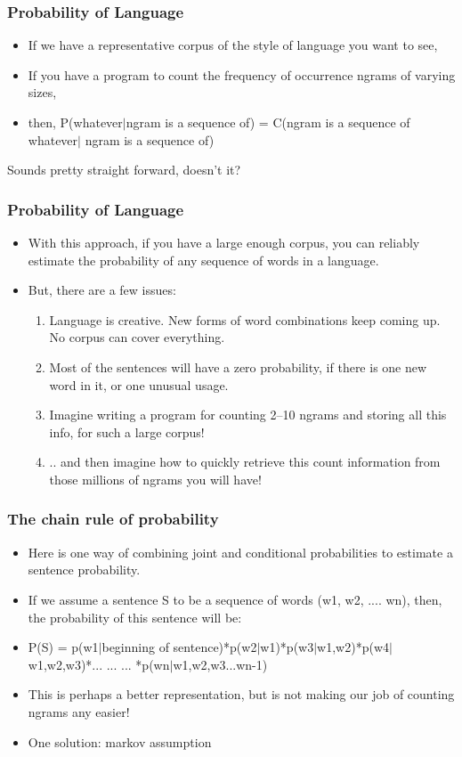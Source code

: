 \documentclass{beamer}
\begin{document}
\begin{frame}
\frametitle{Probability of Language}
\begin{itemize}
\item If we have a representative corpus of the style of language you want to see, 
\item If you have a program to count the frequency of occurrence ngrams of varying sizes,
\item then, P(whatever$|$ngram is a sequence of)  = C(ngram is a sequence of whatever$|$ ngram is a sequence of)
\end{itemize}
Sounds pretty straight forward, doesn't it?
\end{frame}

\begin{frame}
\frametitle{Probability of Language}
\begin{itemize}
\item With this approach, if you have a large enough corpus, you can reliably estimate the probability of any sequence of words in a language.
\item But, there are a few issues:
\begin{enumerate}
\item Language is creative. New forms of word combinations keep coming up. No corpus can cover everything. \pause
\item Most of the sentences will have a zero probability, if there is one new word in it, or one unusual usage. \pause
\item Imagine writing a program for counting 2--10 ngrams and storing all this info, for such a large corpus! \pause
\item .. and then imagine how to quickly retrieve this count information from those millions of ngrams you will have!
\end{enumerate}
\end{itemize}
\end{frame}

\begin{frame}
\frametitle{The chain rule of probability}
\begin{itemize}
\item Here is one way of combining joint and conditional probabilities to estimate a sentence probability.
\item If we assume a sentence S to be a sequence of words (w1, w2, .... wn), then, the probability of this sentence will be:
\item P(S) = p(w1$|$beginning of sentence)*p(w2$|$w1)*p(w3$|$w1,w2)*p(w4$|$w1,w2,w3)*... ... ... *p(wn$|$w1,w2,w3...wn-1)
\item This is perhaps a better representation, but is not making our job of counting ngrams any easier!
\item One solution: markov assumption
\end{itemize}
\end{frame}
\end{document}
